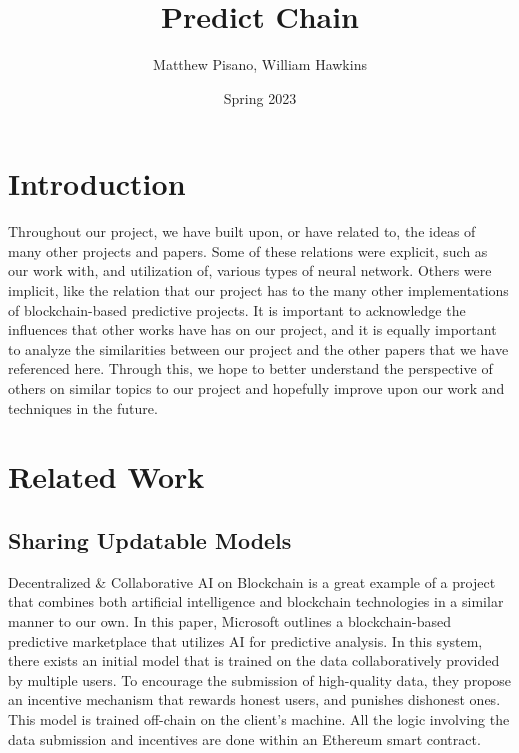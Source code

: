 \documentclass{article}
\title{Predict Chain}
\author{Matthew Pisano, William Hawkins}
\date{Spring 2023}
\begin{document}
    \maketitle

    \section{Introduction}

    Throughout our project, we have built upon, or have related to, the ideas of many other projects and papers.
    Some of these relations were explicit, such as our work with, and utilization of, various types of neural
    network.  Others were implicit, like the relation that our project has to the many other implementations of
    blockchain-based predictive projects.  It is important to acknowledge the influences that other works have
    has on our project, and it is equally important to analyze the similarities between our project and the
    other papers that we have referenced here.  Through this, we hope to better understand the perspective of
    others on similar topics to our project and hopefully improve upon our work and techniques in the future.


    \section{Related Work}
    
    \subsection{Sharing Updatable Models}

    Decentralized \& Collaborative AI on Blockchain\cite{sharingModels} is a great example of a project that combines
    both artificial intelligence and blockchain technologies in a similar manner to our own.  In this paper, Microsoft
    outlines a blockchain-based predictive marketplace that utilizes AI for predictive analysis.  In this system, there
    exists an initial model that is trained on the data collaboratively provided by multiple users.  To encourage
    the submission of high-quality data, they propose an incentive mechanism that rewards honest users, and punishes
    dishonest ones.  This model is trained off-chain on the client's machine.  All the logic involving the
    data submission and incentives are done within an Ethereum smart contract.
    
\end{document}
